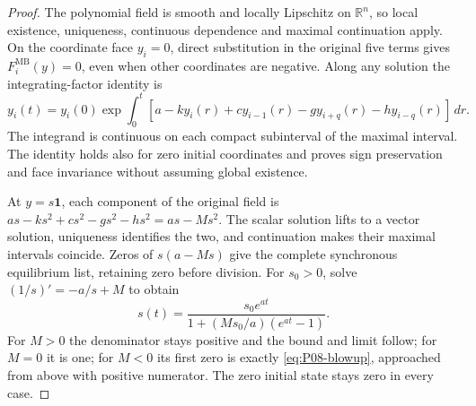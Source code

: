 \documentclass[11pt]{article}
\newcommand{\R}{\mathbb{R}}
\newcommand{\one}{\mathbf{1}}
\newcommand{\MB}{\mathrm{MB}}
\theoremstyle{definition}
\theoremstyle{remark}
\begin{document}
\begin{proof}
The polynomial field is smooth and locally Lipschitz on $\R^n$, so
local existence, uniqueness, continuous dependence and maximal
continuation apply. On the coordinate face $y_i=0$, direct substitution
in the original five terms gives $F_i^{\MB}(y)=0$, even when other
coordinates are negative. Along any solution the integrating-factor
identity is
\begin{equation}
 y_i(t)=y_i(0)\exp\int_0^t
 [a-ky_i(r)+cy_{i-1}(r)-gy_{i+q}(r)-hy_{i-q}(r)]\,dr.
 \label{eq:P08-coordinate}
\end{equation}
The integrand is continuous on each compact subinterval of the maximal
interval. The identity holds also for zero initial coordinates and
proves sign preservation and face invariance without assuming global
existence.

At $y=s\one$, each component of the original field is
$as-ks^2+cs^2-gs^2-hs^2=as-Ms^2$. The scalar solution lifts to a
vector solution, uniqueness identifies the two, and continuation makes
their maximal intervals coincide. Zeros of $s(a-Ms)$ give the complete
synchronous equilibrium list, retaining zero before division. For
$s_0>0$, solve $(1/s)'=-a/s+M$ to obtain
\begin{equation}
 s(t)=\frac{s_0e^{at}}{1+(Ms_0/a)(e^{at}-1)}.\label{eq:P08-logistic}
\end{equation}
For $M>0$ the denominator stays positive and the bound and limit follow;
for $M=0$ it is one; for $M<0$ its first zero is exactly
\eqref{eq:P08-blowup}, approached from above with positive numerator.
The zero initial state stays zero in every case.
\end{proof}
\end{document}

